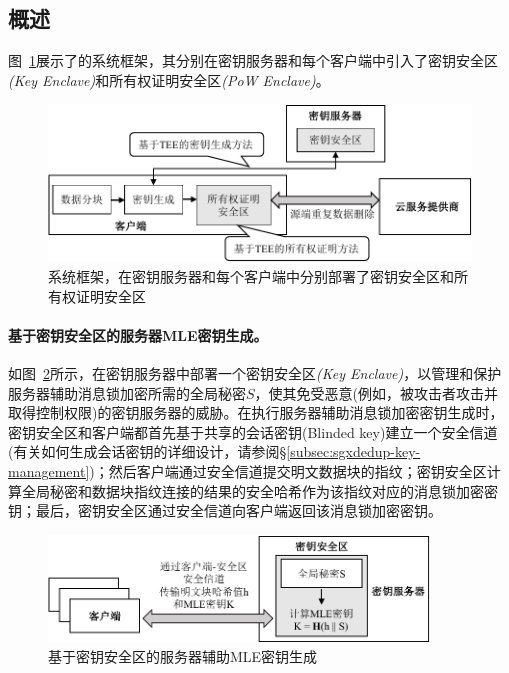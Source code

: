 \subsection{概述}
\label{subsec:sgxdedup-arch}

图~\ref{fig:sgxdedup-overview}展示了\sysnameS 的系统框架，其分别在密钥服务器和每个客户端中引入了密钥安全区\textit{(Key Enclave)}和所有权证明安全区\textit{(PoW Enclave)}。

\begin{figure}[!htb]
  \centering
  \includegraphics[width=\textwidth]{pic/sgxdedup/sgxdedup-arch.pdf}
  \caption{\sysnameS 系统框架，在密钥服务器和每个客户端中分别部署了密钥安全区和所有权证明安全区}
  \label{fig:sgxdedup-overview}
\end{figure}

\paragraph*{基于密钥安全区的服务器MLE密钥生成。}如图~\ref{fig:sgxdedup-overview-key}所示，\sysnameS 在密钥服务器中部署一个密钥安全区\textit{(Key Enclave)}，以管理和保护服务器辅助消息锁加密所需的全局秘密$S$，使其免受恶意(例如，被攻击者攻击并取得控制权限)的密钥服务器的威胁。在执行服务器辅助消息锁加密密钥生成时，密钥安全区和客户端都首先基于共享的会话密钥(Blinded key)建立一个安全信道(有关如何生成会话密钥的详细设计，请参阅\S\ref{subsec:sgxdedup-key-management})；然后客户端通过安全信道提交明文数据块的指纹；密钥安全区计算全局秘密和数据块指纹连接的结果的安全哈希作为该指纹对应的消息锁加密密钥；最后，密钥安全区通过安全信道向客户端返回该消息锁加密密钥。

\begin{figure}[!htb]
  \centering
  \includegraphics[width=0.9\textwidth]{pic/sgxdedup/key-enclave.pdf}
  \caption{基于密钥安全区的服务器辅助MLE密钥生成}
  \label{fig:sgxdedup-overview-key}
\end{figure}

